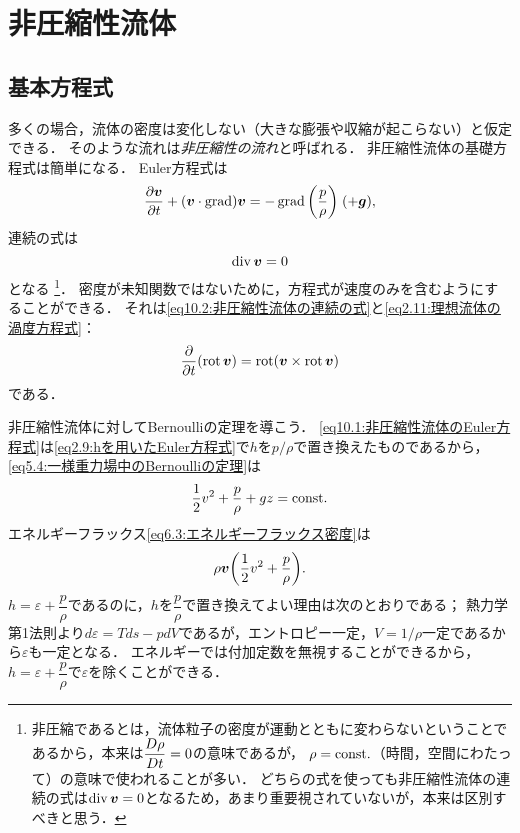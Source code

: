 \section{非圧縮性流体}\label{sec:10}
\subsection*{基本方程式}
多くの場合，流体の密度は変化しない（大きな膨張や収縮が起こらない）と仮定できる．
そのような流れは\emph{非圧縮性の流れ}と呼ばれる．
非圧縮性流体の基礎方程式は簡単になる．
Euler方程式は
\begin{equation}\label{eq10.1:非圧縮性流体のEuler方程式}
    \pdv{\v}{t} + (\v\cdot\Grad)\v = -\Grad \pqty{ \frac{p}{\rho} } \; (+\vec{g}), 
\end{equation}
連続の式は
\begin{equation}\label{eq10.2:非圧縮性流体の連続の式}
    \operatorname{div}\vb*{v} = 0
\end{equation}
となる
\footnote{
非圧縮であるとは，流体粒子の密度が運動とともに変わらないということであるから，本来は$\dfrac{D \rho}{D t}=0$の意味であるが，
$\rho=\mathrm{const.}$（時間，空間にわたって）の意味で使われることが多い．
どちらの式を使っても非圧縮性流体の連続の式は$\operatorname{div}\vb*{v} = 0$となるため，あまり重要視されていないが，本来は区別すべきと思う．
}．
密度が未知関数ではないために，方程式が速度のみを含むようにすることができる．
それは\eqref{eq10.2:非圧縮性流体の連続の式}と\eqref{eq2.11:理想流体の渦度方程式}：
\begin{equation}\label{eq10.3:理想流体の渦度方程式（再）}
    \pdv{t}(\operatorname{rot}\vb*{v}) =  \operatorname{rot}(\vb*{v} \times \operatorname{rot} \vb*{v})
\end{equation}
である．

非圧縮性流体に対してBernoulliの定理を導こう．
\eqref{eq10.1:非圧縮性流体のEuler方程式}は\eqref{eq2.9:hを用いたEuler方程式}で$h$を$p/\rho$で置き換えたものであるから，\eqref{eq5.4:一様重力場中のBernoulliの定理}は
\begin{equation}
    \frac{1}{2}v^2 + \frac{p}{\rho} +gz = \mathrm{const.}
\end{equation}
エネルギーフラックス\eqref{eq6.3:エネルギーフラックス密度}は
\begin{equation}
    \rho\v \pqty{\frac{1}{2}v^2 + \frac{p}{\rho}}.
\end{equation}
$h = \varepsilon + \dfrac{p}{\rho}$であるのに，$h$を$\dfrac{p}{\rho}$で置き換えてよい理由は次のとおりである；
熱力学第1法則より$d\varepsilon = Tds - pdV$であるが，エントロピー一定，$V = 1/\rho$一定であるから$\varepsilon$も一定となる．
エネルギーでは付加定数を無視することができるから，$h = \varepsilon + \dfrac{p}{\rho}$で$\varepsilon$を除くことができる．



